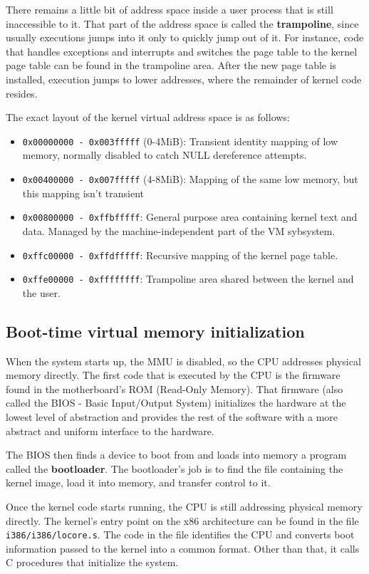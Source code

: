 \documentclass[shortabstract, english]{iithesis}
\begin{document}
There remains a little bit of address space inside a user process that is still
inaccessible to it. That part of the address space is called the
\textbf{trampoline}, since usually executions jumps into it only to quickly jump
out of it. For instance, code that handles exceptions and interrupts and
switches the page table to the kernel page table can be found in the trampoline
area. After the new page table is installed, execution jumps to lower addresses,
where the remainder of kernel code resides.

The exact layout of the kernel virtual address space is as follows:
\begin{itemize}
\item \texttt{0x00000000 - 0x003fffff} (0-4MiB): Transient identity mapping of
  low memory, normally disabled to catch NULL dereference attempts.
\item \texttt{0x00400000 - 0x007fffff} (4-8MiB): Mapping of the same low memory,
  but this mapping isn't transient
\item \texttt{0x00800000 - 0xffbfffff}: General purpose area containing kernel
  text and data. Managed by the machine-independent part of the VM sybsystem.
\item \texttt{0xffc00000 - 0xffdfffff}: Recursive mapping of the kernel page
  table.
\item \texttt{0xffe00000 - 0xffffffff}: Trampoline area shared between the
  kernel and the user.
\end{itemize}

\subsection{Boot-time virtual memory initialization}

When the system starts up, the MMU is disabled, so the CPU addresses physical
memory directly. The first code that is executed by the CPU is the firmware
found in the motherboard's ROM (Read-Only Memory). That firmware (also called
the BIOS - Basic Input/Output System) initializes the hardware at the lowest
level of abstraction and provides the rest of the software with a more abstract
and uniform interface to the hardware.

The BIOS then finds a device to boot from and loads into memory a program called
the \textbf{bootloader}. The bootloader's job is to find the file containing the
kernel image, load it into memory, and transfer control to it.

Once the kernel code starts running, the CPU is still addressing physical memory
directly. The kernel's entry point on the x86 architecture can be found in the
file \texttt{i386/i386/locore.s}. The code in the file identifies the CPU and
converts boot information passed to the kernel into a common format. Other than
that, it calls C procedures that initialize the system.
\end{document}
